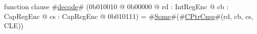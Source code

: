 function clause #\hyperref[zdecode]{decode}# (0b010010 @ 0b00000 @ rd : IntRegEnc @ cb : CapRegEnc @ cs : CapRegEnc @ 0b010111) = #\hyperref[zSome]{Some}#(#\hyperref[zCPtrCmp]{CPtrCmp}#(rd, cb, cs, CLE))
